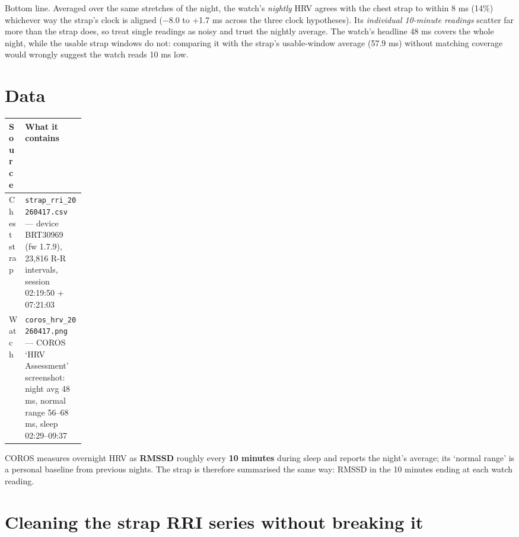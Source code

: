 \documentclass[11pt,a4paper]{article}
\begin{document}
\begin{keybox}{Bottom line.}
Averaged over the same stretches of the night, the watch's \emph{nightly} HRV agrees with the chest strap to within 8 ms (14\%) whichever way the strap's clock is aligned (−8.0 to +1.7 ms across the three clock hypotheses). Its \emph{individual 10-minute readings} scatter far more than the strap does, so treat single readings as noisy and trust the nightly average. The watch's headline 48 ms covers the whole night, while the usable strap windows do not: comparing it with the strap's usable-window average (57.9 ms) without matching coverage would wrongly suggest the watch reads 10 ms low.
\end{keybox}
\section{Data}\label{sec:data}
\begin{center}
\small
\begin{tabularx}{\linewidth}{L{0.15\linewidth}Y}
\toprule
\textbf{Source} & \textbf{What it contains} \\
\midrule
Chest strap & \texttt{strap\_\allowbreak{}rri\_\allowbreak{}20260417.\allowbreak{}csv} — device BRT30969 (fw 1.7.9), 23,816 R-R intervals, session 02:19:50 + 07:21:03 \\
Watch & \texttt{coros\_\allowbreak{}hrv\_\allowbreak{}20260417.\allowbreak{}png} — COROS `HRV Assessment' screenshot: night avg 48 ms, normal range 56–68 ms, sleep 02:29–09:37 \\
\bottomrule
\end{tabularx}
\end{center}
COROS measures overnight HRV as \textbf{RMSSD} roughly every \textbf{10 minutes} during sleep and reports the night's average; its `normal range' is a personal baseline from previous nights. The strap is therefore summarised the same way: RMSSD in the 10 minutes ending at each watch reading.

\section{Cleaning the strap RRI series without breaking it}\label{sec:cleaning-the-strap-rri-series-without-breaking-it}
\end{document}

